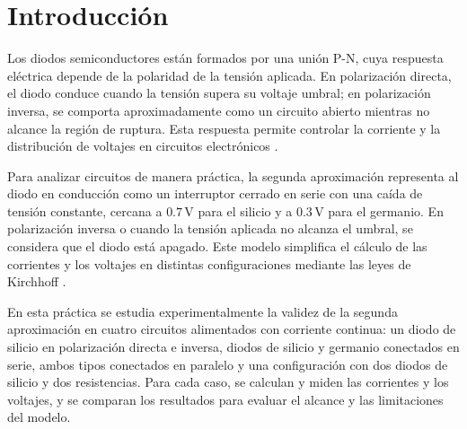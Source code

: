 ﻿\section{Introducción}

Los diodos semiconductores están formados por una unión P-N, cuya respuesta eléctrica depende de la polaridad de la tensión aplicada. En polarización directa, el diodo conduce cuando la tensión supera su voltaje umbral; en polarización inversa, se comporta aproximadamente como un circuito abierto mientras no alcance la región de ruptura. Esta respuesta permite controlar la corriente y la distribución de voltajes en circuitos electrónicos \cite{REF_2,REF_3}.

Para analizar circuitos de manera práctica, la segunda aproximación representa al diodo en conducción como un interruptor cerrado en serie con una caída de tensión constante, cercana a $0.7\,\text{V}$ para el silicio y a $0.3\,\text{V}$ para el germanio. En polarización inversa o cuando la tensión aplicada no alcanza el umbral, se considera que el diodo está apagado. Este modelo simplifica el cálculo de las corrientes y los voltajes en distintas configuraciones mediante las leyes de Kirchhoff \cite{REF_2,REF_5}.

En esta práctica se estudia experimentalmente la validez de la segunda aproximación en cuatro circuitos alimentados con corriente continua: un diodo de silicio en polarización directa e inversa, diodos de silicio y germanio conectados en serie, ambos tipos conectados en paralelo y una configuración con dos diodos de silicio y dos resistencias. Para cada caso, se calculan y miden las corrientes y los voltajes, y se comparan los resultados para evaluar el alcance y las limitaciones del modelo.

